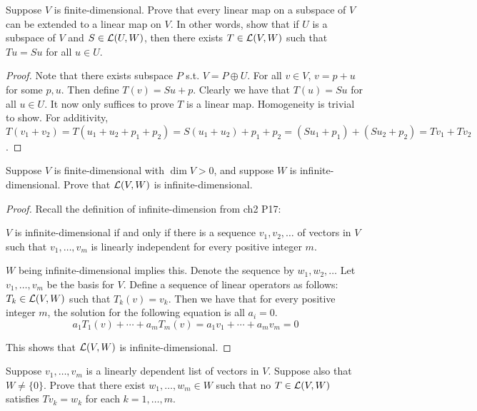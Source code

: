 \documentclass{extarticle}
\begin{document}
\begin{problem}{13}
    Suppose \(V\) is finite-dimensional. Prove that every linear map on a subspace of \(V\) can 
    be extended to a linear map on \(V\). In other words, show that if \(U\) is a subspace of 
    \(V\) and \(S \in \mathcal{L}(U, W)\), then there exists \(T \in \mathcal{L}(V, W)\) such that 
    \(Tu = Su\) for all \(u \in U\).
\end{problem}

\begin{proof}
Note that there exists subspace \(P\) s.t. \(V = P \oplus U\). For all \(v \in V\),
\(v = p + u\) for some \(p, u\). Then define \(T(v) = Su + p\). Clearly we have that 
\(T(u) = Su \) for all \(u \in U\). It now only suffices to prove \(T\) is a linear map.
Homogeneity is trivial to show. For additivity, \(T(v_1 + v_2) = T(u_1 + u_2 + p_1 + p_2)
= S(u_1 + u_2) + p_1 + p_2 = (S u_1 + p_1) + (S u_2 + p_2) = Tv_1 + T v_2\).
\end{proof}

\begin{problem}{14}
    Suppose \(V\) is finite-dimensional with \(\dim V > 0\), and suppose \(W\)
    is infinite-dimensional. Prove that \(\mathcal{L} (V, W)\) is infinite-dimensional. 
\end{problem}

\begin{proof}
Recall the definition of infinite-dimension from ch2 P17:

\begin{center}
    \(V\) is infinite-dimensional if and only if there is a sequence 
    \(v_1, v_2, \ldots\) of vectors in \(V\) such that \(v_1, \ldots, v_m\)
    is linearly independent for every positive integer \(m\). 
\end{center}

\(W\) being infinite-dimensional implies this. Denote the sequence by \(w_1, w_2, \ldots\)
 Let \(v_1, \ldots, v_m\) be the basis for \(V\). 
Define a sequence of linear operators as follows: \(T_k \in \mathcal{L}(V, W)\) such that \(T_k (v) = v_k\). 
Then we have that for every positive integer \(m\), the solution for the following equation 
is all \(a_i = 0\). 
\[a_1T_1(v) + \cdots + a_m T_m(v) = a_1 v_1 + \cdots + a_m v_m = 0\]

This shows that \(\mathcal{L}(V, W)\) is infinite-dimensional.
\end{proof}

\begin{problem}{15}
    Suppose \(v_1, \ldots, v_m\) is a linearly dependent list of vectors in \(V\). Suppose also that 
    \(W \neq \{0\}\). Prove that there exist \(w_1, \ldots, w_m \in W\) such that no 
    \(T \in \mathcal{L}(V, W)\) satisfies \(Tv_k = w_k\) for each \(k = 1, \ldots, m\). 
\end{problem}
\end{document}
